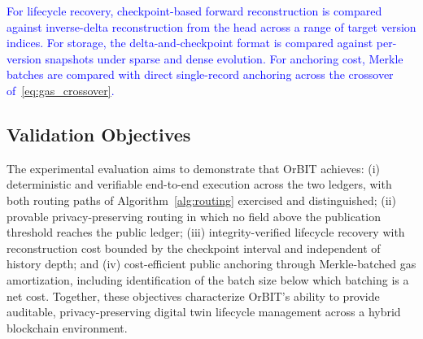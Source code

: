 \documentclass[final,5p,times,twocolumn]{elsarticle}
\begin{document}
\textcolor{blue}{For lifecycle recovery, checkpoint-based forward reconstruction is compared against inverse-delta reconstruction from the head across a range of target version indices. For storage, the delta-and-checkpoint format is compared against per-version snapshots under sparse and dense evolution. For anchoring cost, Merkle batches are compared with direct single-record anchoring across the crossover of~\eqref{eq:gas_crossover}.}

\subsection{\textbf{Validation Objectives}}
The experimental evaluation aims to demonstrate that OrBIT achieves: (i) deterministic and verifiable end-to-end execution across the two ledgers, with both routing paths of Algorithm~\ref{alg:routing} exercised and distinguished; (ii) provable privacy-preserving routing in which no field above the publication threshold reaches the public ledger; (iii) integrity-verified lifecycle recovery with reconstruction cost bounded by the checkpoint interval and independent of history depth; and (iv) cost-efficient public anchoring through Merkle-batched gas amortization, including identification of the batch size below which batching is a net cost. Together, these objectives characterize OrBIT's ability to provide auditable, privacy-preserving digital twin lifecycle management across a hybrid blockchain environment.



%
\end{document}
